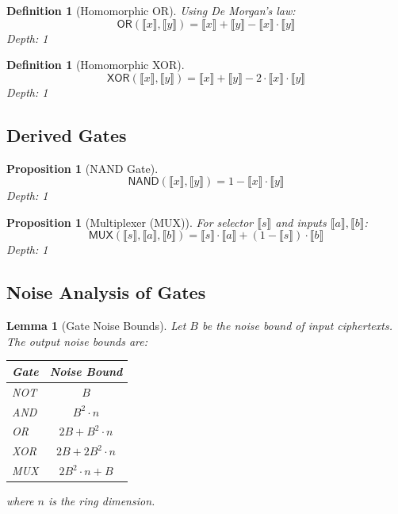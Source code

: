 \documentclass[11pt,a4paper]{article}
\newtheorem{lemma}[theorem]{Lemma}
\newtheorem{proposition}[theorem]{Proposition}
\newtheorem{definition}[theorem]{Definition}
\begin{document}
\begin{definition}[Homomorphic OR]
Using De Morgan's law:
\begin{equation}
\textsf{OR}(\llbracket x \rrbracket, \llbracket y \rrbracket) = \llbracket x \rrbracket + \llbracket y \rrbracket - \llbracket x \rrbracket \cdot \llbracket y \rrbracket
\end{equation}
Depth: 1
\end{definition}

\begin{definition}[Homomorphic XOR]
\begin{equation}
\textsf{XOR}(\llbracket x \rrbracket, \llbracket y \rrbracket) = \llbracket x \rrbracket + \llbracket y \rrbracket - 2 \cdot \llbracket x \rrbracket \cdot \llbracket y \rrbracket
\end{equation}
Depth: 1
\end{definition}

\subsection{Derived Gates}

\begin{proposition}[NAND Gate]
\begin{equation}
\textsf{NAND}(\llbracket x \rrbracket, \llbracket y \rrbracket) = 1 - \llbracket x \rrbracket \cdot \llbracket y \rrbracket
\end{equation}
Depth: 1
\end{proposition}

\begin{proposition}[Multiplexer (MUX)]
For selector $\llbracket s \rrbracket$ and inputs $\llbracket a \rrbracket, \llbracket b \rrbracket$:
\begin{equation}
\textsf{MUX}(\llbracket s \rrbracket, \llbracket a \rrbracket, \llbracket b \rrbracket) = \llbracket s \rrbracket \cdot \llbracket a \rrbracket + (1 - \llbracket s \rrbracket) \cdot \llbracket b \rrbracket
\end{equation}
Depth: 1
\end{proposition}

\subsection{Noise Analysis of Gates}

\begin{lemma}[Gate Noise Bounds]
Let $B$ be the noise bound of input ciphertexts. The output noise bounds are:
\begin{center}
\begin{tabular}{lc}
\toprule
Gate & Noise Bound \\
\midrule
NOT & $B$ \\
AND & $B^2 \cdot n$ \\
OR & $2B + B^2 \cdot n$ \\
XOR & $2B + 2B^2 \cdot n$ \\
MUX & $2B^2 \cdot n + B$ \\
\bottomrule
\end{tabular}
\end{center}
where $n$ is the ring dimension.
\end{lemma}
\end{document}

